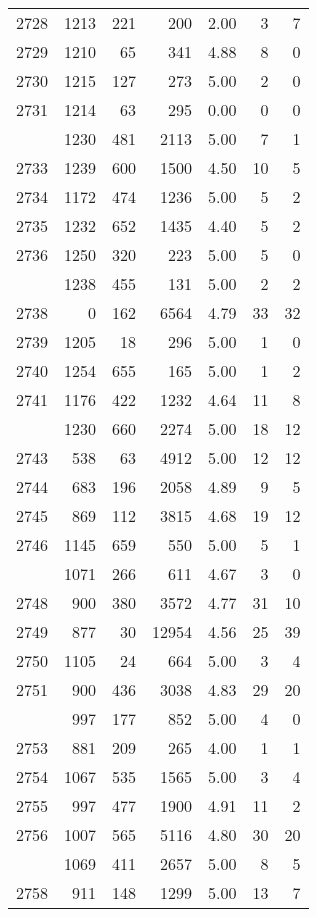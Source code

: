 \documentclass[
]{article}
\begin{document}
\begin{table}
\begin{tabular}[t]{lrrrrrr}
2728 & 1213 & 221 & 200 & 2.00 & 3 & 7\\
2729 & 1210 & 65 & 341 & 4.88 & 8 & 0\\
2730 & 1215 & 127 & 273 & 5.00 & 2 & 0\\
2731 & 1214 & 63 & 295 & 0.00 & 0 & 0\\
\addlinespace
2732 & 1230 & 481 & 2113 & 5.00 & 7 & 1\\
2733 & 1239 & 600 & 1500 & 4.50 & 10 & 5\\
2734 & 1172 & 474 & 1236 & 5.00 & 5 & 2\\
2735 & 1232 & 652 & 1435 & 4.40 & 5 & 2\\
2736 & 1250 & 320 & 223 & 5.00 & 5 & 0\\
\addlinespace
2737 & 1238 & 455 & 131 & 5.00 & 2 & 2\\
2738 & 0 & 162 & 6564 & 4.79 & 33 & 32\\
2739 & 1205 & 18 & 296 & 5.00 & 1 & 0\\
2740 & 1254 & 655 & 165 & 5.00 & 1 & 2\\
2741 & 1176 & 422 & 1232 & 4.64 & 11 & 8\\
\addlinespace
2742 & 1230 & 660 & 2274 & 5.00 & 18 & 12\\
2743 & 538 & 63 & 4912 & 5.00 & 12 & 12\\
2744 & 683 & 196 & 2058 & 4.89 & 9 & 5\\
2745 & 869 & 112 & 3815 & 4.68 & 19 & 12\\
2746 & 1145 & 659 & 550 & 5.00 & 5 & 1\\
\addlinespace
2747 & 1071 & 266 & 611 & 4.67 & 3 & 0\\
2748 & 900 & 380 & 3572 & 4.77 & 31 & 10\\
2749 & 877 & 30 & 12954 & 4.56 & 25 & 39\\
2750 & 1105 & 24 & 664 & 5.00 & 3 & 4\\
2751 & 900 & 436 & 3038 & 4.83 & 29 & 20\\
\addlinespace
2752 & 997 & 177 & 852 & 5.00 & 4 & 0\\
2753 & 881 & 209 & 265 & 4.00 & 1 & 1\\
2754 & 1067 & 535 & 1565 & 5.00 & 3 & 4\\
2755 & 997 & 477 & 1900 & 4.91 & 11 & 2\\
2756 & 1007 & 565 & 5116 & 4.80 & 30 & 20\\
\addlinespace
2757 & 1069 & 411 & 2657 & 5.00 & 8 & 5\\
2758 & 911 & 148 & 1299 & 5.00 & 13 & 7\\

\end{tabular}
\end{table}
\end{document}
